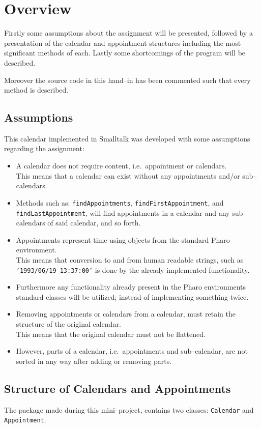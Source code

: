 \chapter{Overview}
Firstly some assumptions about the assignment will be presented, followed by a presentation of the calendar and appointment structures including the most significant methods of each.
Lastly some shortcomings of the program will be described.

Moreover the source code in this hand--in has been commented such that every method is described.

\section{Assumptions}
This calendar implemented in Smalltalk was developed with some assumptions regarding the assignment:
\begin{itemize}
    \item A calendar does not require content, i.e.~appointment or calendars.\\
        This means that a calendar can exist without any appointments and/or sub--calendars.
    \item Methods such as: \texttt{findAppointments}, \texttt{findFirstAppointment}, and\\
        \texttt{findLastAppointment}, will find appointments in a calendar and any sub--calendars of said calendar, and so forth.
    \item Appointments represent time using objects from the standard Pharo environment.\\
        This means that conversion to and from human readable strings, such as \texttt{'1993/06/19 13:37:00'} is done by the already implemented functionality.
    \item Furthermore any functionality already present in the Pharo environments standard classes will be utilized;
        instead of implementing something twice.
    \item Removing appointments or calendars from a calendar, must retain the structure of the original calendar.\\
        This means that the original calendar must not be flattened.
    \item However, parts of a calendar, i.e.~appointments and sub--calendar, are not sorted in any way after adding or removing parts.
\end{itemize}

\section{Structure of Calendars and Appointments}
The package made during this mini--project, contains two classes: \texttt{Calendar} and \texttt{Appointment}.

